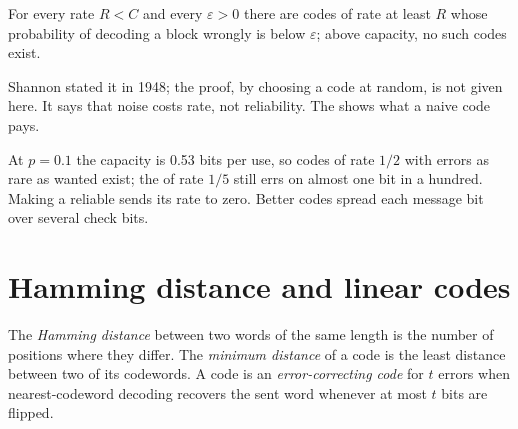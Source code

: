 \begin{theorem}\label{thm:b3:information-and-codes:noisy-channel}
For every rate $R < C$ and every $\varepsilon > 0$ there are codes of rate at least $R$ whose probability of decoding a block wrongly is below $\varepsilon$; above capacity, no such codes exist.
\end{theorem}

Shannon stated it in 1948; the proof, by choosing a code at random, is not given here. %
It says that noise costs rate, not reliability. The  shows what a naive code pays.

\label{lst:b3:information-and-codes:bsc}

\label{out:b3:information-and-codes:bsc}

\label{out:b3:information-and-codes:capacity}

At $p = 0.1$ the capacity is 0.53 bits per use, so codes of rate $1/2$ with errors as rare as wanted exist; the  of rate $1/5$ still errs on almost one bit in a hundred. Making a  reliable sends its rate to zero. Better codes spread each message bit over several check bits.

\section{Hamming distance and linear codes}\label{sec:b3:information-and-codes:linear}

\begin{definition}\label{def:b3:information-and-codes:distance}
The \emph{Hamming distance} between two words of the same length is the number of positions where they differ. The \emph{minimum distance} of a code is the least distance between two of its codewords. A code is an \emph{error-correcting code} for $t$ errors when nearest-codeword decoding recovers the sent word whenever at most $t$ bits are flipped.
\end{definition}

